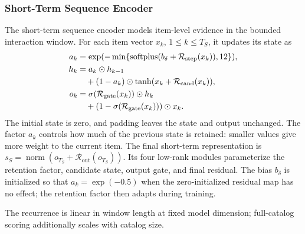 \documentclass[11pt]{article}
\newcommand{\norm}[1]{\operatorname{norm}(#1)}
\begin{document}
\subsubsection{Short-Term Sequence Encoder}
The short-term sequence encoder models item-level evidence in the bounded interaction window. For each item vector $x_k$, $1\leq k\leq T_S$, it updates its state as
\begin{align}
 a_k &= \exp(-\min\{\operatorname{softplus}(b_\delta
              +\mathcal R_{\mathrm{step}}(x_k)),12\}),\notag \\
 h_k &= a_k\odot h_{k-1}\notag\\
     &\quad +(1-a_k)\odot\tanh(x_k+\mathcal R_{\mathrm{cand}}(x_k)),\notag \\
 o_k &= \sigma(\mathcal R_{\mathrm{gate}}(x_k))\odot h_k\notag\\
     &\quad +(1-\sigma(\mathcal R_{\mathrm{gate}}(x_k)))\odot x_k.
\end{align}
The initial state is zero, and padding leaves the state and output unchanged. The factor $a_k$ controls how much of the previous state is retained: smaller values give more weight to the current item. The final short-term representation is $s_S=\norm{o_{T_S}+\mathcal R_{\mathrm{out}}(o_{T_S})}$. Its four low-rank modules parameterize the retention factor, candidate state, output gate, and final residual. The bias $b_\delta$ is initialized so that $a_k=\exp(-0.5)$ when the zero-initialized residual map has no effect; the retention factor then adapts during training.

The recurrence is linear in window length at fixed model dimension; full-catalog scoring additionally scales with catalog size.
\end{document}
